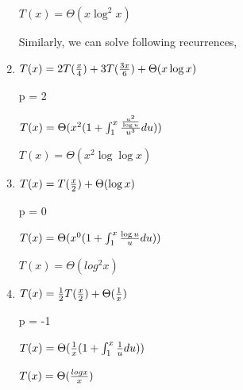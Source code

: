 \documentclass[11pt]{article}
\begin{document}
\begin{enumerate}
\begin{center}
$T(x) = \Theta(x\log^2 x) $
\end{center}

Similarly, we can solve following recurrences,

\item \textbf{$T(x) = 2T{({x \over 4})} + 3T({3x \over 6}) + \Theta(x\log x)$} \\

\begin{center}
    p = 2 
\end{center}

\begin{center}
$T(x) = \Theta(x^2(1 + \int_1^x { {u^2\over \log u} \over u^3} du))$
\end{center}

\begin{center}
$T(x) = \Theta(x^2 \log\log x) $
\end{center}

\item \textbf{$T(x) = T{({x \over 2})} + \Theta(\log x)$} \\
\begin{center}
    p = 0 
\end{center}

\begin{center}
$T(x) = \Theta(x^0(1 + \int_1^x {\log u\over u} du))$
\end{center}

\begin{center}
$T(x) = \Theta(log^2 x) $
\end{center}

\item \textbf{$T(x) = {1 \over 2} T{({x \over 2})} + \Theta({1 \over x})$} \\
\begin{center}
    p = -1 
\end{center}

\begin{center}
$T(x) = \Theta({1 \over x}(1 + \int_1^x {1 \over u} du))$
\end{center}

\begin{center}
$T(x) = \Theta({log x \over x}) $
\end{center}

\end{enumerate}
\end{document}

